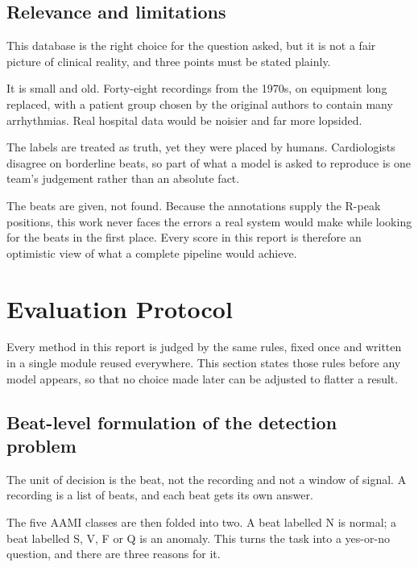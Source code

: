 \documentclass[a4paper, 12pt]{article}
\begin{document}
\subsection{Relevance and limitations}\label{subsec:datalimits}

This database is the right choice for the question asked, but it is not a fair
picture of clinical reality, and three points must be stated plainly.

It is small and old. Forty-eight recordings from the 1970s, on equipment long
replaced, with a patient group chosen by the original authors to contain many
arrhythmias. Real hospital data would be noisier and far more lopsided.

The labels are treated as truth, yet they were placed by humans. Cardiologists
disagree on borderline beats, so part of what a model is asked to reproduce is
one team's judgement rather than an absolute fact.

The beats are given, not found. Because the annotations supply the R-peak
positions, this work never faces the errors a real system would make while looking
for the beats in the first place. Every score in this report is therefore an
optimistic view of what a complete pipeline would achieve.





\section{Evaluation Protocol} \label{sec:evaluation}

Every method in this report is judged by the same rules, fixed once and written in
a single module reused everywhere. This section states those rules before any
model appears, so that no choice made later can be adjusted to flatter a result.

\subsection{Beat-level formulation of the detection problem}\label{subsec:formulation}

The unit of decision is the beat, not the recording and not a window of signal. A
recording is a list of beats, and each beat gets its own answer.

The five AAMI classes are then folded into two. A beat labelled N is normal; a
beat labelled S, V, F or Q is an anomaly. This turns the task into a yes-or-no
question, and there are three reasons for it.
\end{document}
